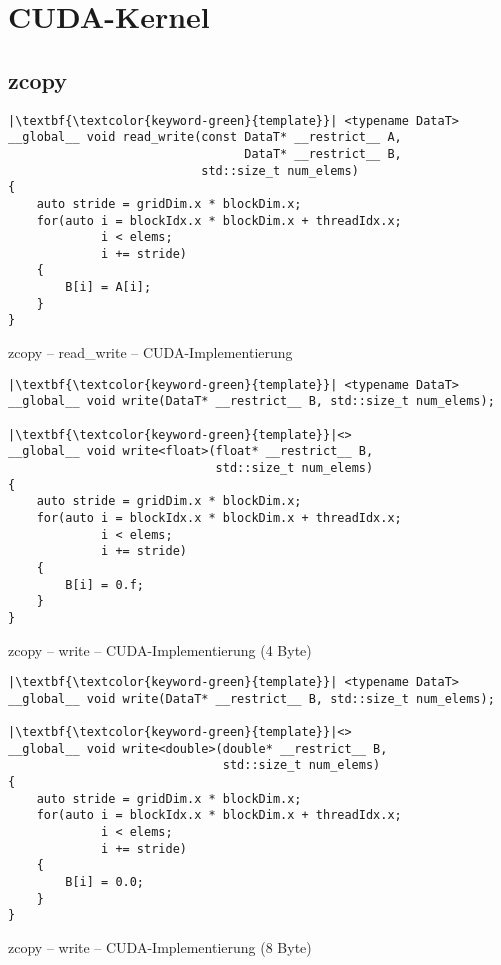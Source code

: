 \appendix

\section{CUDA-Kernel}

\subsection{zcopy}

\begin{code}
    \begin{verbatim}
|\textbf{\textcolor{keyword-green}{template}}| <typename DataT>
__global__ void read_write(const DataT* __restrict__ A,
                                 DataT* __restrict__ B,
                           std::size_t num_elems)
{
    auto stride = gridDim.x * blockDim.x;
    for(auto i = blockIdx.x * blockDim.x + threadIdx.x;
             i < elems;
             i += stride)
    {
        B[i] = A[i];
    }
}
    \end{verbatim}
    \caption{zcopy -- read\_write -- CUDA-Implementierung}
    \label{anhang:cuda:zcopyrw}
\end{code}

\begin{code}
    \begin{verbatim}
|\textbf{\textcolor{keyword-green}{template}}| <typename DataT>
__global__ void write(DataT* __restrict__ B, std::size_t num_elems);

|\textbf{\textcolor{keyword-green}{template}}|<>
__global__ void write<float>(float* __restrict__ B,
                             std::size_t num_elems)
{
    auto stride = gridDim.x * blockDim.x;
    for(auto i = blockIdx.x * blockDim.x + threadIdx.x;
             i < elems;
             i += stride)
    {
        B[i] = 0.f;
    }
}
    \end{verbatim}
    \caption{zcopy -- write -- CUDA-Implementierung (4 Byte)}
    \label{anhang:cuda:zcopyw4}
\end{code}

\begin{code}
    \begin{verbatim}
|\textbf{\textcolor{keyword-green}{template}}| <typename DataT>
__global__ void write(DataT* __restrict__ B, std::size_t num_elems);

|\textbf{\textcolor{keyword-green}{template}}|<>
__global__ void write<double>(double* __restrict__ B,
                              std::size_t num_elems)
{
    auto stride = gridDim.x * blockDim.x;
    for(auto i = blockIdx.x * blockDim.x + threadIdx.x;
             i < elems;
             i += stride)
    {
        B[i] = 0.0;
    }
}
    \end{verbatim}
    \caption{zcopy -- write -- CUDA-Implementierung (8 Byte)}
    \label{anhang:cuda:zcopyw8}
\end{code}

